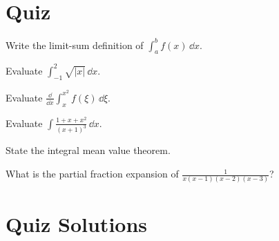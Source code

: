 \raggedbottom
\pagebreak
\flushbottom
\section{Quiz}


\begin{QuizProblem}
  \label{quiz problem limit sum definition}
  Write the limit-sum definition of $\int_a^b f(x)\,\dd x$.

\end{QuizProblem}


\begin{QuizProblem}
  \label{quiz problem int sqrt |x|}
  Evaluate $\int_{-1}^2 \sqrt{|x|} \,\dd x$.

\end{QuizProblem}


\begin{QuizProblem}
  \label{quiz problem ddx int x x2 f}
  Evaluate $\frac{\dd}{\dd x} \int_x^{x^2} f(\xi) \,\dd \xi$.

\end{QuizProblem}


\begin{QuizProblem}
  \label{quiz problem int 1xx2 x13}
  Evaluate $\int \frac{1+x+x^2}{(x+1)^3} \,\dd x$.

\end{QuizProblem}


\begin{QuizProblem}
  \label{quiz problem integral mean value theorem}
  State the integral mean value theorem.

\end{QuizProblem}


\begin{QuizProblem}
  \label{quiz problem partial fraction 1xx-1x-2x-3}
  What is the partial fraction expansion of $\frac{1}{x(x-1)(x-2)(x-3)}$?

\end{QuizProblem}






\raggedbottom
\pagebreak
\flushbottom
\section{Quiz Solutions}



